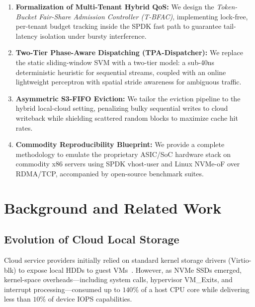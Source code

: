 \documentclass[10pt,twocolumn]{article}
\begin{document}
\begin{enumerate}
    \item \textbf{Formalization of Multi-Tenant Hybrid QoS:} We design the \textit{Token-Bucket Fair-Share Admission Controller (T-BFAC)}, implementing lock-free, per-tenant budget tracking inside the SPDK fast path to guarantee tail-latency isolation under bursty interference.
    \item \textbf{Two-Tier Phase-Aware Dispatching (TPA-Dispatcher):} We replace the static sliding-window SVM with a two-tier model: a sub-40ns deterministic heuristic for sequential streams, coupled with an online lightweight perceptron with spatial stride awareness for ambiguous traffic.
    \item \textbf{Asymmetric S3-FIFO Eviction:} We tailor the eviction pipeline to the hybrid local-cloud setting, penalizing bulky sequential writes to cloud writeback while shielding scattered random blocks to maximize cache hit rates.
    \item \textbf{Commodity Reproducibility Blueprint:} We provide a complete methodology to emulate the proprietary ASIC/SoC hardware stack on commodity x86 servers using SPDK vhost-user and Linux NVMe-oF over RDMA/TCP, accompanied by open-source benchmark suites.
\end{enumerate}

\section{Background and Related Work}

\subsection{Evolution of Cloud Local Storage}
Cloud service providers initially relied on standard kernel storage drivers (Virtio-blk) to expose local HDDs to guest VMs~\cite{yang2026here}. However, as NVMe SSDs emerged, kernel-space overheads—including system calls, hypervisor VM\_Exits, and interrupt processing—consumed up to $140\%$ of a host CPU core while delivering less than $10\%$ of device IOPS capabilities.
\end{document}
